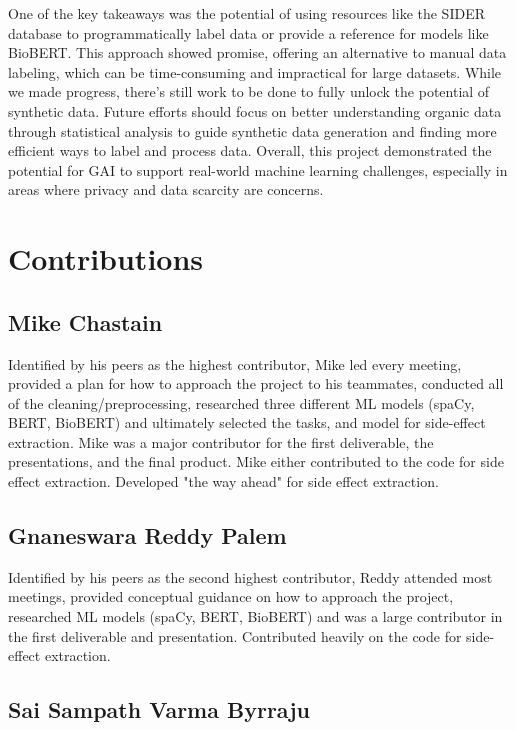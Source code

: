 \documentclass[sigplan,screen]{acmart}
\begin{document}
One of the key takeaways was the potential of using resources like the SIDER database to programmatically label data or provide a reference for models like BioBERT. This approach showed promise, offering an alternative to manual data labeling, which can be time-consuming and impractical for large datasets. While we made progress, there’s still work to be done to fully unlock the potential of synthetic data. Future efforts should focus on better understanding organic data through statistical analysis to guide synthetic data generation and finding more efficient ways to label and process data. Overall, this project demonstrated the potential for GAI to support real-world machine learning challenges, especially in areas where privacy and data scarcity are concerns.

\section{Contributions}

\subsection{Mike Chastain} 

Identified by his peers as the highest contributor, Mike led every meeting, provided a plan for how to approach the project to his teammates, conducted all of the cleaning/preprocessing, researched three different ML models (spaCy, BERT, BioBERT) and ultimately selected the tasks, and model for side-effect extraction. Mike was a major contributor for the first deliverable, the presentations, and the final product. Mike either contributed to the code for side effect extraction. Developed "the way ahead" for side effect extraction.

\subsection{Gnaneswara Reddy Palem} 

Identified by his peers as the second highest contributor, Reddy attended most meetings, provided conceptual guidance on how to approach the project, researched ML models (spaCy, BERT, BioBERT) and was a large contributor in the first deliverable and presentation. Contributed heavily on the code for side-effect extraction.

\subsection{Sai Sampath Varma Byrraju} 
\end{document}
